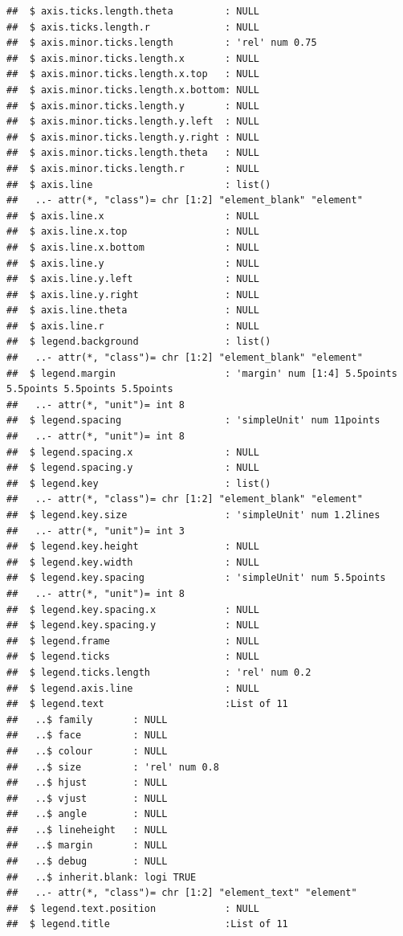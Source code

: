 \documentclass[
  12pt,
]{article}
\begin{document}
\begin{verbatim}
##  $ axis.ticks.length.theta         : NULL
##  $ axis.ticks.length.r             : NULL
##  $ axis.minor.ticks.length         : 'rel' num 0.75
##  $ axis.minor.ticks.length.x       : NULL
##  $ axis.minor.ticks.length.x.top   : NULL
##  $ axis.minor.ticks.length.x.bottom: NULL
##  $ axis.minor.ticks.length.y       : NULL
##  $ axis.minor.ticks.length.y.left  : NULL
##  $ axis.minor.ticks.length.y.right : NULL
##  $ axis.minor.ticks.length.theta   : NULL
##  $ axis.minor.ticks.length.r       : NULL
##  $ axis.line                       : list()
##   ..- attr(*, "class")= chr [1:2] "element_blank" "element"
##  $ axis.line.x                     : NULL
##  $ axis.line.x.top                 : NULL
##  $ axis.line.x.bottom              : NULL
##  $ axis.line.y                     : NULL
##  $ axis.line.y.left                : NULL
##  $ axis.line.y.right               : NULL
##  $ axis.line.theta                 : NULL
##  $ axis.line.r                     : NULL
##  $ legend.background               : list()
##   ..- attr(*, "class")= chr [1:2] "element_blank" "element"
##  $ legend.margin                   : 'margin' num [1:4] 5.5points 5.5points 5.5points 5.5points
##   ..- attr(*, "unit")= int 8
##  $ legend.spacing                  : 'simpleUnit' num 11points
##   ..- attr(*, "unit")= int 8
##  $ legend.spacing.x                : NULL
##  $ legend.spacing.y                : NULL
##  $ legend.key                      : list()
##   ..- attr(*, "class")= chr [1:2] "element_blank" "element"
##  $ legend.key.size                 : 'simpleUnit' num 1.2lines
##   ..- attr(*, "unit")= int 3
##  $ legend.key.height               : NULL
##  $ legend.key.width                : NULL
##  $ legend.key.spacing              : 'simpleUnit' num 5.5points
##   ..- attr(*, "unit")= int 8
##  $ legend.key.spacing.x            : NULL
##  $ legend.key.spacing.y            : NULL
##  $ legend.frame                    : NULL
##  $ legend.ticks                    : NULL
##  $ legend.ticks.length             : 'rel' num 0.2
##  $ legend.axis.line                : NULL
##  $ legend.text                     :List of 11
##   ..$ family       : NULL
##   ..$ face         : NULL
##   ..$ colour       : NULL
##   ..$ size         : 'rel' num 0.8
##   ..$ hjust        : NULL
##   ..$ vjust        : NULL
##   ..$ angle        : NULL
##   ..$ lineheight   : NULL
##   ..$ margin       : NULL
##   ..$ debug        : NULL
##   ..$ inherit.blank: logi TRUE
##   ..- attr(*, "class")= chr [1:2] "element_text" "element"
##  $ legend.text.position            : NULL
##  $ legend.title                    :List of 11

\end{verbatim}
\end{document}
